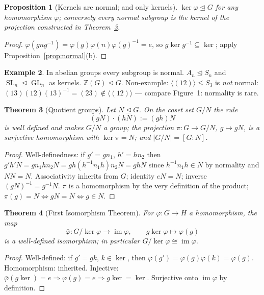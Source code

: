 \documentclass[11pt,a4paper]{article}
\newtheorem{theorem}{Theorem}[section]
\newtheorem{proposition}[theorem]{Proposition}
\theoremstyle{definition}
\newtheorem{example}[theorem]{Example}
\newcommand{\Z}{\mathbb{Z}}
\newcommand{\GL}{\operatorname{GL}}
\newcommand{\SL}{\operatorname{SL}}
\newcommand{\im}{\operatorname{im}}
\begin{document}
	\begin{proposition}[Kernels are normal; and only kernels]\label{prop:kernel-normal}
		$\ker\varphi\trianglelefteq G$ for any homomorphism $\varphi$; conversely every normal subgroup is
		the kernel of the projection constructed in Theorem~\ref{thm:quotient}.
	\end{proposition}
	\begin{proof}
		$\varphi(gng^{-1})=\varphi(g)\varphi(n)\varphi(g)^{-1}=e$, so $g\ker g^{-1}\subseteq\ker$; apply
		Proposition~\ref{prop:normal}(b).
	\end{proof}
	
	\begin{example}
		In abelian groups every subgroup is normal. $A_n\trianglelefteq S_n$ and $\SL_n\trianglelefteq
		\GL_n$ as kernels. $\Z(G)\trianglelefteq G$. Non-example: $\langle(12)\rangle\le S_3$ is \emph{not}
		normal: $(13)(12)(13)^{-1}=(23)\notin\langle(12)\rangle$ --- compare Figure~1: normality is rare.
	\end{example}
	
	\begin{theorem}[Quotient groups]\label{thm:quotient}
		Let $N\trianglelefteq G$. On the coset set $G/N$ the rule
		\[
		(gN)\cdot(hN):=(gh)N
		\]
		is well defined and makes $G/N$ a group; the projection $\pi:G\to G/N$, $g\mapsto gN$, is a
		surjective homomorphism with $\ker\pi=N$; and $|G/N|=[G:N]$.
	\end{theorem}
	\begin{proof}
		Well-definedness: if $g'=gn_1$, $h'=hn_2$ then
		$g'h'N=gn_1hn_2N=g h (h^{-1}n_1 h)n_2 N=ghN$ since $h^{-1}n_1h\in N$ by normality and $N N=N$.
		Associativity inherits from $G$; identity $eN=N$; inverse $(gN)^{-1}=g^{-1}N$. $\pi$ is a
		homomorphism by the very definition of the product; $\pi(g)=N\iff gN=N\iff g\in N$.
	\end{proof}
	
	\begin{theorem}[First Isomorphism Theorem]\label{thm:first-iso}
		For $\varphi:G\to H$ a homomorphism, the map
		\[
		\bar\varphi:G/\ker\varphi\longrightarrow\im\varphi,\qquad g\ker\varphi\longmapsto\varphi(g)
		\]
		is a well-defined isomorphism; in particular $G/\ker\varphi\cong\im\varphi$.
	\end{theorem}
	\begin{proof}
		Well-defined: if $g'=gk$, $k\in\ker$, then $\varphi(g')=\varphi(g)\varphi(k)=\varphi(g)$. Homomorphism:
		inherited. Injective: $\bar\varphi(g\ker)=e\Rightarrow\varphi(g)=e\Rightarrow g\ker=\ker$. Surjective
		onto $\im\varphi$ by definition.
	\end{proof}
	
\end{document}
